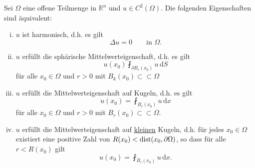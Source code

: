 \begin{satz}
	Sei $\Omega$ eine offene Teilmenge in $\mathbb{R}^n$ und $u \in C^2(\Omega)$. Die folgenden Eigenschaften sind äquivalent:
	\begin{enumerate}[(i)]
		\item $u$ ist harmonisch, d.h. es gilt 
		\begin{equation}
			\Delta u = 0 \qquad \text{in } \Omega.
		\end{equation}
		\item $u$ erfüllt die sphärische Mittelwerteigenschaft, d.h. es gilt
		\begin{equation}
			u(x_0) \fint_{\partial B_r(x_0)}^{}u \,\mathrm{d}S
		\end{equation}
		für alle $x_0 \in \Omega$ und $r>0$ mit $B_k(x_0) \subset \subset \Omega$
		\item $u$ erfüllt die Mittelwerteigenschaft auf Kugeln, d.h. es gilt
		\begin{equation}
			u(x_0) = \fint_{B_r(x_0)}^{}u \,\mathrm{d}x
		\end{equation}
		für alle $x_0 \in \Omega$ und $r > 0$ mit $B_r(x_0) \subset \subset \Omega$.
		\item $u$ erfüllt die Mittelwerteigenschaft auf \underline{kleinen} Kugeln, d.h. für jedes $x_0 \in \Omega$ existiert eine positive Zahl von $R(x_0) < \operatorname{dist}(x_0,\partial \Omega)$, so dass für alle $r < R(x_0)$ gilt
		\begin{equation}
			u(x_0) = \fint_{B_r(x_0)}^{}u \,\mathrm{d}x.
		\end{equation}
	\end{enumerate}
\end{satz}
